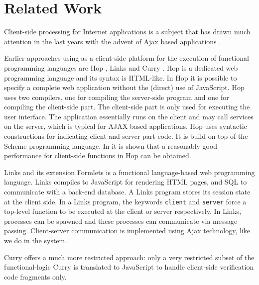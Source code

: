 \section{Related Work}\label{sapljs:sec:related}
Client-side processing for Internet applications is a subject that has drawn much attention in the last years with the advent of \textsf{Ajax} based
applications \cite{AJAX}.

Earlier approaches using \JS as a client-side platform for the execution of functional programming languages are \textsf{Hop} \cite{HOP1,HOP2},
Links \cite{LINKS1}and \textsf{Curry}  \cite{CURRY}. 
\textsf{Hop} is a dedicated web programming language and its syntax is \textsf{HTML}-like. 
In \textsf{Hop} it is  possible to specify a complete web application without the (direct) use of \textsf{JavaScript}. 
\textsf{Hop} uses two compilers, one for compiling the server-side program and one for compiling the client-side part. 
The client-side part is only used for executing the user interface. 
The application essentially runs on the client and may call services on the server, which is typical for \textsf{AJAX} based applications. 
\textsf{Hop} uses syntactic constructions for indicating client and server part code. It is build on top of the Scheme programming language. 
In \cite{HOP2} it is shown that a reasonably good performance for client-side functions in \textsf{Hop} can be obtained. 

\textsf{Links} \cite{LINKS1} and its extension \textsf{Formlets}  is a functional language-based web programming language. \textsf{Links} compiles to \textsf{JavaScript} for rendering \textsf{HTML} pages, and SQL to communicate with a back-end database. A \textsf{Links} program stores its session state at the client side. In a \textsf{Links} program, the keywords \texttt{client} and \texttt{server} force a top-level function to be executed at the client or server respectively. In \textsf{Links}, processes can be spawned and these processes can communicate via message passing. Client-server communication is implemented using \textsf{Ajax} technology, like we do in the \iTask system. 

 \textsf{Curry} offers a much more restricted approach:
 only a very restricted subset of the functional-logic \textsf{Curry} is translated to \textsf{JavaScript} to handle client-side verification code fragments only.


